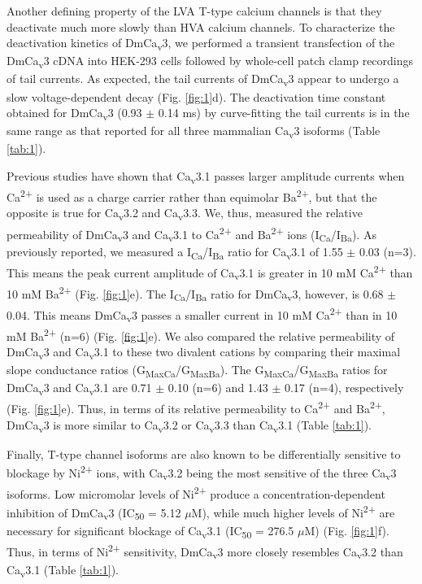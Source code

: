 Another defining property of the LVA T-type calcium channels is that they deactivate much more slowly than HVA calcium channels\cite{PerezReyes:1998gn,lee:1999aa,matteson:1986aa}. 
To characterize the deactivation kinetics of DmCa\textsubscript{v}3, we performed a transient transfection of the DmCa\textsubscript{v}3 cDNA into HEK-293 cells followed by whole-cell patch clamp recordings of tail currents.
As expected, the tail currents of DmCa\textsubscript{v}3 appear to undergo a slow voltage-dependent decay (Fig. \ref{fig:1}d).
The deactivation time constant obtained for DmCa\textsubscript{v}3 (0.93 $\pm$ 0.14 ms) by curve-fitting the tail currents is in the same range as that reported for all three mammalian Ca\textsubscript{v}3 isoforms (Table \ref{tab:1}). 

Previous studies have shown that Ca\textsubscript{v}3.1 passes larger amplitude currents when Ca\textsuperscript{2+} is used as a charge carrier rather than equimolar Ba\textsuperscript{2+}, but that the opposite is true for Ca\textsubscript{v}3.2 and Ca\textsubscript{v}3.3\cite{mcrory:2000aa,shcheglovitov:2007aa}.
We, thus, measured the relative permeability of DmCa\textsubscript{v}3 and Ca\textsubscript{v}3.1 to Ca\textsuperscript{2+} and Ba\textsuperscript{2+} ions (I\textsubscript{Ca}/I\textsubscript{Ba}).
As previously reported, we measured a I\textsubscript{Ca}/I\textsubscript{Ba} ratio for Ca\textsubscript{v}3.1 of 1.55 $\pm$ 0.03 (n=3). This means the peak current amplitude of Ca\textsubscript{v}3.1 is greater in 10 mM Ca\textsuperscript{2+} than 10 mM Ba\textsuperscript{2+} (Fig. \ref{fig:1}e).
The I\textsubscript{Ca}/I\textsubscript{Ba} ratio for DmCa\textsubscript{v}3, however, is 0.68 $\pm$ 0.04. This means DmCa\textsubscript{v}3 passes a smaller current in 10 mM Ca\textsuperscript{2+} than in 10 mM Ba\textsuperscript{2+} (n=6) (Fig. \ref{fig:1}e).
We also compared the relative permeability of DmCa\textsubscript{v}3 and Ca\textsubscript{v}3.1 to these two divalent cations by comparing their maximal slope conductance ratios (G\textsubscript{MaxCa}/G\textsubscript{MaxBa}).
The G\textsubscript{MaxCa}/G\textsubscript{MaxBa} ratios for DmCa\textsubscript{v}3 and Ca\textsubscript{v}3.1 are 0.71 $\pm$ 0.10 (n=6) and 1.43 $\pm$ 0.17 (n=4), respectively (Fig. \ref{fig:1}e).
Thus, in terms of its relative permeability to Ca\textsuperscript{2+} and Ba\textsuperscript{2+}, DmCa\textsubscript{v}3 is more similar to Ca\textsubscript{v}3.2 or Ca\textsubscript{v}3.3 than Ca\textsubscript{v}3.1 (Table \ref{tab:1}).

Finally, T-type channel isoforms are also known to be differentially sensitive to blockage by Ni\textsuperscript{2+} ions, with Ca\textsubscript{v}3.2 being the most sensitive of the three Ca\textsubscript{v}3 isoforms\cite{lee:1999ab}.
Low micromolar levels of Ni\textsuperscript{2+} produce a concentration-dependent inhibition of DmCa\textsubscript{v}3 (IC\textsubscript{50} = 5.12 $\mu$M), while much higher levels of Ni\textsuperscript{2+} are necessary for significant blockage of Ca\textsubscript{v}3.1 (IC\textsubscript{50} = 276.5 $\mu$M) (Fig. \ref{fig:1}f).
Thus, in terms of Ni\textsuperscript{2+} sensitivity, DmCa\textsubscript{v}3 more closely resembles Ca\textsubscript{v}3.2 than Ca\textsubscript{v}3.1 (Table \ref{tab:1}).
